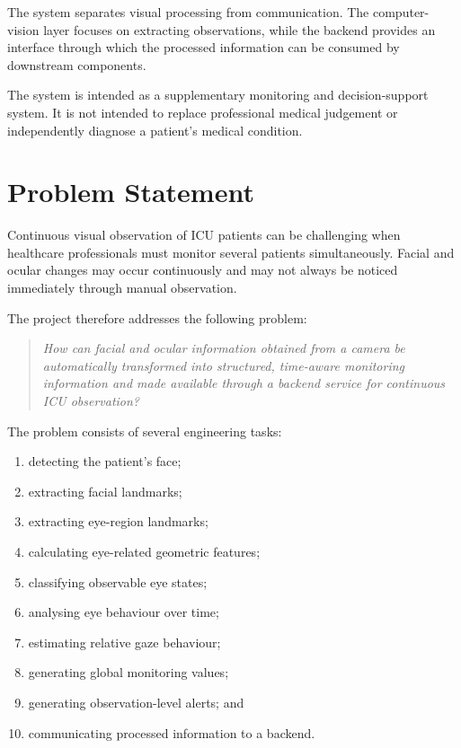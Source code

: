\documentclass{tietreport}
\begin{document}
The system separates visual processing from communication. The
computer-vision layer focuses on extracting observations, while the
backend provides an interface through which the processed information
can be consumed by downstream components.

The system is intended as a supplementary monitoring and decision-support
system. It is not intended to replace professional medical judgement
or independently diagnose a patient's medical condition.


\section{Problem Statement}

Continuous visual observation of ICU patients can be challenging when
healthcare professionals must monitor several patients simultaneously.
Facial and ocular changes may occur continuously and may not always be
noticed immediately through manual observation.

The project therefore addresses the following problem:

\begin{quote}
\itshape
How can facial and ocular information obtained from a camera be
automatically transformed into structured, time-aware monitoring
information and made available through a backend service for
continuous ICU observation?
\end{quote}

The problem consists of several engineering tasks:

\begin{enumerate}
    \item detecting the patient's face;
    \item extracting facial landmarks;
    \item extracting eye-region landmarks;
    \item calculating eye-related geometric features;
    \item classifying observable eye states;
    \item analysing eye behaviour over time;
    \item estimating relative gaze behaviour;
    \item generating global monitoring values;
    \item generating observation-level alerts; and
    \item communicating processed information to a backend.
\end{enumerate}
\end{document}
